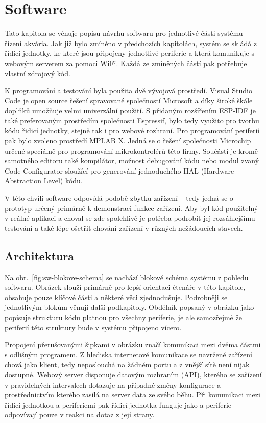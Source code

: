 \chapter{Software}
    Tato kapitola se věnuje popisu návrhu softwaru pro jednotlivé části systému řízení akvária. Jak již bylo zmíněno v předchozích kapitolách, systém se skládá z řídicí jednotky, ke které jsou připojeny jednotlivé periferie a která komunikuje s webovým serverem za pomoci WiFi. Každá ze zmíněných částí pak potřebuje vlastní zdrojový kód. 
    
    K programování a testování byla použita dvě vývojová prostředí. Visual Studio Code je open source řešení spravované společností Microsoft a díky široké škále doplňků umožňuje velmi univerzální použití. S přidaným rozšířením ESP-IDF je také preferovaným prostředím společnosti Espressif, bylo tedy využito pro tvorbu kódu řidicí jednotky, stejně tak i pro webové rozhraní. Pro programování periferií pak bylo zvoleno prostředí MPLAB X. Jedná se o řešení společnosti Microchip určené speciálně pro programování mikrokontrolérů této firmy. Součástí je kromě samotného editoru také kompilátor, možnost debugování kódu nebo modul zvaný Code Configurator sloužící pro generování jednoduchého HAL (Hardware Abstraction Level) kódu.

    V této chvíli software odpovídá podobě zbytku zařízení -- tedy jedná se o prototyp určený primárně k demonstraci funkce zařízení. Aby byl kód použitelný v reálné aplikaci a choval se zde spolehlivě je potřeba podrobit jej rozsáhlejšímu testování a také lépe ošetřit chování zařízení v různých nežádoucích stavech.   

\section{Architektura}
    Na obr.~\ref{fig:sw-blokove-schema} se nachází blokové schéma systému z pohledu softwaru. Obrázek slouží primárně pro lepší orientaci čtenáře v této kapitole, obsahuje pouze klíčové části a některé věci zjednodušuje. Podrobněji se jednotlivým blokům věnují další podkapitoly. Obdélník popsaný v obrázku jako  popisuje strukturu kódu platnou pro všechny periferie, je ale samozřejmé že periferií této struktury bude v systému připojeno vícero.

    Propojení přerušovanými šipkami v obrázku značí komunikaci mezi dvěma částmi s odlišným programem. Z hlediska internetové komunikace se navržené zařízení chová jako klient, tedy neposlouchá na žádném portu a z vnější sítě není nijak dostupné. Webový server disponuje datovým rozhraním (API), kterého se zařízení v pravidelných intervalech dotazuje na případné změny konfigurace a prostřednictvím kterého zasílá na server data ze svého běhu. Při komunikaci mezi řídicí jednotkou a periferiemi pak řídicí jednotka funguje jako  a periferie odpovívají pouze v reakci na dotaz z její strany.

